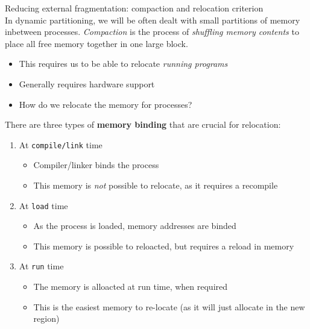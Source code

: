 \documentclass[journal, letterpaper]{IEEEtran}
\begin{document}
\begin{aside}{Reducing external fragmentation: compaction and relocation criterion} \\
    In dynamic partitioning, we will be often dealt with small partitions of memory inbetween processes. \textit{Compaction} is the process of \textit{shuffling memory contents} to place all free memory together in one large block.
    \begin{itemize}
        \item This requires us to be able to relocate \textit{running programs}
        \item Generally requires hardware support
        \item How do we relocate the memory for processes?
    \end{itemize}
    There are three types of \textbf{memory binding} that are crucial for relocation:
    \begin{enumerate}
        \item At \verb|compile/link| time
        \begin{itemize}
            \item Compiler/linker binds the process
            \item This memory is \textit{not} possible to relocate, as it requires a recompile
        \end{itemize}
        \item At \verb|load| time
        \begin{itemize}
            \item As the process is loaded, memory addresses are binded
            \item This memory is possible to reloacted, but requires a reload in memory
        \end{itemize}
        \item At \verb|run| time
        \begin{itemize}
            \item The memory is alloacted at run time, when required
            \item This is the easiest memory to re-locate (as it will just allocate in the new region)
        \end{itemize}
    \end{enumerate}
\end{aside}
\end{document}
